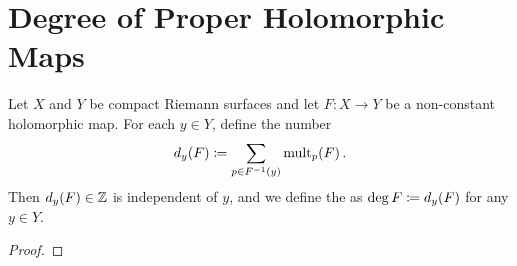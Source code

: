 \documentclass[../Moduli_Spaces_of_Riemann_Surfaces.tex]{subfiles}
\begin{document}
    \section{Degree of Proper Holomorphic Maps}\label{sec:degree_proper_holomorphic_map}
    \begin{defthm}
        Let $X$ and $Y$ be compact Riemann surfaces and let $F:X\to Y$ be a non-constant holomorphic map. For each $y\in Y$, define the number
        \begin{equation*}
            d_y\!\left(F\right)\coloneqq\sum_{p\in F^{-1}\left(y\right)}\operatorname{mult}_p\!\left(F\right).
        \end{equation*}
        Then $d_y\!\left(F\right)\in\mathbb{Z}$ is independent of $y$, and we define the  as $\deg F\coloneqq d_y\!\left(F\right)$ for any $y\in Y$.
    \end{defthm}
    \begin{proof}
        
    \end{proof}
\end{document}
